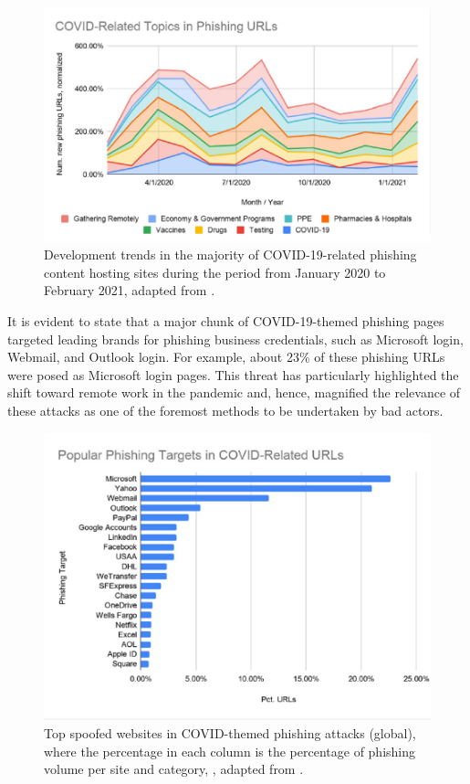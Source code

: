 \captionsetup{font= footnotesize}
\begin{figure}[H]
    \centering
    \includegraphics[width=0.8\linewidth]{background/CovidPhising.png}
    \caption{Development trends in the majority of COVID-19-related phishing content hosting sites during the period from January 2020 to February 2021, adapted from \cite{Unit42AtricleCovidPhishing2021}.}
    \label{fig:figFourteen}
\end{figure}

It is evident to state that a major chunk of COVID-19-themed phishing pages targeted leading brands for phishing business credentials, such as Microsoft login, Webmail, and Outlook login. For example, about 23\% of these phishing URLs were posed as Microsoft login pages. This threat has particularly highlighted the shift toward remote work in the pandemic and, hence, magnified the relevance of these attacks as one of the foremost methods to be undertaken by bad actors.


\captionsetup{font= footnotesize}
\begin{figure}[H]
    \centering
    \includegraphics[width=0.8\linewidth]{background/TOPCOVIDURLS.png}
    \caption{Top spoofed websites in COVID-themed phishing attacks (global), where the percentage in each column is the percentage of phishing volume per site and category, , adapted from \cite{Unit42AtricleCovidPhishing2021}.}
    \label{fig:figFiveteen}
\end{figure}

